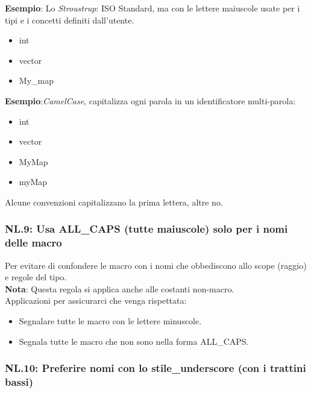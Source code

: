 \textsf{\small \textbf{Esempio}: Lo \emph{Stroustrup}: ISO Standard, ma con le lettere maiuscole usate per i tipi e i concetti definiti dall'utente. }

\begin{itemize}
	\item \textsf{\small int}
	\item \textsf{\small vector}
	\item \textsf{\small My\_map}
\end{itemize}

\textsf{\small \textbf{Esempio}:\emph{CamelCase}, capitalizza ogni parola in un identificatore multi-parola: }

\begin{itemize}
	\item \textsf{\small int}
	\item \textsf{\small vector}
	\item \textsf{\small MyMap}
	\item \textsf{\small myMap}
\end{itemize}

\textsf{\small Alcune convenzioni capitalizzano la prima lettera, altre no.} \\

\subsubsection{NL.9: Usa ALL\_CAPS (tutte maiuscole) solo per i nomi delle macro}

\textsf{\small Per evitare di confondere le macro con i nomi che obbediscono allo scope (raggio) e regole del tipo.} \\

\textsf{\small \textbf{Nota}: Questa regola si applica anche alle costanti non-macro.} \\

\textsf{\small Applicazioni per assicurarci che venga rispettata: } 

\begin{itemize}
	\item \textsf{\small Segnalare tutte le macro con le lettere minuscole.}
	\item \textsf{\small Segnala tutte le macro che non sono nella forma ALL\_CAPS.}
\end{itemize}

\subsubsection{NL.10: Preferire nomi con lo stile\_underscore (con i trattini bassi)}

